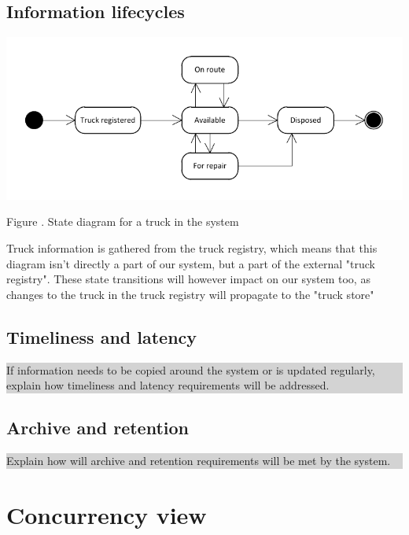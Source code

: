 \documentclass[a4paper,11pt]{report}
\newcommand{\instructions}[1]{
  \noindent\colorbox{lightgray}{%
    \parbox{\linewidth}{%
      #1
    }%
  }%
 \vspace{0.1cm}
}
\newcommand{\mycaption}[1]{
  \addtocounter{figures}{1}
  Figure \arabic{figures}. #1
}
\begin{document}
\subsection{Information lifecycles}
\label{sec:inform-lifecycl}

\begin{center}
  \includegraphics[width=\textwidth]{figures/Information_lifecycle}\\
  \mycaption{State diagram for a truck in the system}
\end{center}

Truck information is gathered from the truck registry, which means that this diagram isn't directly a part of our system, but a part of the external "truck registry". These state transitions will however impact on our system too, as changes to the truck in the truck registry will propagate to the "truck store" 

\subsection{Timeliness and latency}
\label{sec:timeliness-latency}

\instructions{
If information needs to be copied around the system or is updated
regularly, explain how timeliness and latency requirements will be
addressed.
}

\subsection{Archive and retention}
\label{sec:archive-retention}

\instructions{
Explain how will archive and retention requirements will be met by the
system.
}

\section{Concurrency view}
\label{sec:concurrency-view}
\end{document}
